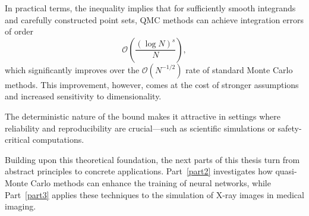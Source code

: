 In practical terms, the inequality implies that for sufficiently smooth integrands and carefully constructed point sets, QMC methods can achieve integration errors of order
\[
\mathcal{O}\left( \frac{(\log N)^s}{N} \right),
\]
which significantly improves over the $\mathcal{O}(N^{-1/2})$ rate of standard Monte Carlo methods. This improvement, however, comes at the cost of stronger assumptions and increased sensitivity to dimensionality.

\begin{remark}
The deterministic nature of the bound makes it attractive in settings where reliability and reproducibility are crucial—such as scientific simulations or safety-critical computations.
\end{remark}

\qquad

Building upon this theoretical foundation, the next parts of this thesis turn
from abstract principles to concrete applications. Part~\ref{part2} investigates
how quasi-Monte Carlo methods can enhance the training of neural networks, while
Part~\ref{part3} applies these techniques to the simulation of X-ray images in
medical imaging.










